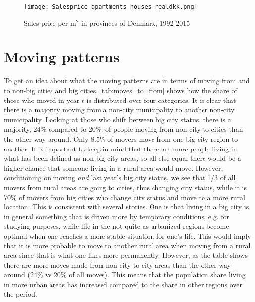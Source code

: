 \begin{figure}
\centering
\texttt{[image: Salesprice\_apartments\_houses\_realdkk.png]} 
\caption{Sales price per $\text{m}^2$ in provinces of Denmark, 1992-2015}
\label{fig:pricesdk}
\end{figure}

\section{Moving patterns}
To get an idea about what the moving patterns are in terms of moving from and to non-big cities and big cities, \autoref{tab:moves_to_from} shows how the share of those who moved in year $t$ is distributed over four categories. It is clear that there is a majority moving from a non-city municipality to another non-city municipality. Looking at those who shift between big city status, there is a majority, 24\% compared to 20\%, of people moving from non-city to cities than the other way around. Only 8.5\% of movers move from one big city region to another. It is important to keep in mind that there are more people living in what has been defined as non-big city areas, so all else equal there would be a higher chance that someone living in a rural area would move. However, conditioning on moving \textit{and} last year's big city status, we see that 1/3 of all movers from rural areas are going to cities, thus changing city status, while it is 70\% of movers from big cities who change city status and move to a more rural location. This is consistent with several stories. One is that living in a big city is in general something that is driven more by temporary conditions, e.g. for studying purposes, while life in the not quite as urbanized regions become optimal when one reaches a more stable situation for one's life. This would imply that it is more probable to move to another rural area when moving from a rural area since that is what one likes more permanently. However, as the table shows there are more moves made from non-city to city areas than the other way around (24\% vs 20\% of all moves). This means that the population share living in more urban areas has increased compared to the share in other regions over the period.

